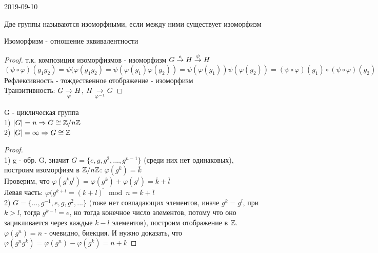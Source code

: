\documentclass[main]{subfiles}
\begin{document}
\begin{lect} {2019-09-10}
	\begin{definition}
	    Две группы называются изоморфными, если между ними существует изоморфизм
	\end{definition}

	\begin{utv}
	    Изоморфизм - отношение эквивалентности
	\end{utv}

	\begin{proof}
	    т.к. композиция изоморфизмов - изоморфизм $G \overset{e}{\rightarrow} H \overset{\psi}{\rightarrow} H$\\
	    $(\psi \circ \varphi)(g_1 g_2)= \psi(\varphi(g_1 g_2)=\psi(\varphi(g_1) \varphi(g_2))=\psi(\varphi(g_1)) \psi(\varphi(g_2)) = (\psi \circ \varphi)(g_1) \circ (\psi \circ \varphi)(g_2)$\\
	    Рефлексивность - тождественное отображение - изоморфизм\\
	    Транзитивность: $G \underset{\varphi}{\rightarrow} H$, $H \underset{\varphi^{-1}}{\rightarrow} G$
	\end{proof}

	\begin{theorem}
	    G - циклическая группа\\
	    1) $|G|=n \Rightarrow G \cong \mathbb{Z} / n \mathbb{Z}$\\
	    2) $|G|=\infty \Rightarrow G \cong \mathbb{Z}$
	\end{theorem}

	\begin{proof}\\
	    1) g - обр. G, значит $G=\{e,g,g^2,...,g^{n-1}\}$ (среди них нет одинаковых), построим изоморфизм в $\mathbb{Z} / n \mathbb{Z}$: $\varphi(g^k)=\overline{k}$\\
	    Проверим, что $\varphi(g^k g^l)= \varphi(g^k)+\varphi(g^l)=\overline{k}+\overline{l}$\\
	    Левая часть: $\varphi(g^{k+l}=\overline{(k+l) \mod n} = \overline{k}+\overline{l}$\\
	    2) $G=\{...,g^{-1},e,g,g^2,...\}$ (тоже нет совпадающих элементов, иначе $g^k=g^l$, при $k>l$, тогда $g^{k-l}=e$, но тогда конечное число элементов, потому что оно зацикливается через каждые $k-l$ элементов), построим отображение в $\mathbb{Z}$.\\
	    $\varphi(g^n)=n$ - очевидно, биекция. И нужно доказать, что $\varphi(g^n g^k)=\varphi(g^n)-\varphi(g^k)=n+k$
	\end{proof}

	\end{lect}
\end{document}
